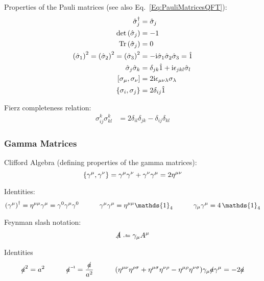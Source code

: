 			\noindent
			Properties of the Pauli matrices (see also Eq.~\ref{Eq:PauliMatricesQFT}):
			\begin{align}
				\label{Eq:PauliMatrices}
				\hat{\sigma}_j^\dagger &= \hat{\sigma}_j \\
				\det\qty(\hat{\sigma}_j) &= -1 \\
				\tr\qty(\hat{\sigma}_j) &= 0 \\
				\qty(\hat{\sigma}_1)^2 = \qty(\hat{\sigma}_2)^2 = \qty(\hat{\sigma}_3)^2 &= -\i\hat{\sigma}_1\hat{\sigma}_2\hat{\sigma}_3 = \hat{1} \\
				\hat{\sigma}_j \hat{\sigma}_k &= \delta_{jk}\hat{1} + \i\levicivita_{jkl}\hat{\sigma}_l \\
				\comm{\sigma_\mu}{\sigma_\nu} &= 2\i\levicivita_{\mu\nu\lambda}\sigma_\lambda \\
				\acomm{\sigma_i}{\sigma_j} &= 2\delta_{ij}\hat{1}
			\end{align}

			\noindent
			Fierz completeness relation:
			\begin{align}
				\sigma^k_{ij} \sigma^k_{kl} &= 2 \delta_{il} \delta_{jk} - \delta_{ij} \delta_{kl}
			\end{align}


		\subsubsection{Gamma Matrices}
			\noindent
			Clifford Algebra (defining properties of the gamma matrices):
			\begin{equation}
				\acomm{\gamma^\mu}{\gamma^\nu} = \gamma^\mu \gamma^\nu + \gamma^\nu \gamma^\mu = 2 \eta^{\mu\nu}
			\end{equation}

			\noindent
			Identities:
			\begin{equation}
				\qty(\gamma^\mu)^\dagger = \eta^{\mu\mu} \gamma^\mu = \gamma^0 \gamma^\mu \gamma^0
				\hsp \gamma^\mu \gamma^\mu = \eta^{\mu\mu} \mathds{1}_4
				\hsp \gamma_\mu \gamma^\mu = 4 \,\mathds{1}_4
			\end{equation}

			\noindent
			Feynman slash notation:
			\begin{equation}
				\slashed{A} \defeq \gamma_\mu A^\mu
			\end{equation}

			\noindent
			Identities
			\begin{equation}
				\slashed{a}^2 = a^2
				\hsp \inv{\slashed{a}} = \frac{\slashed{a}}{a^2}
				\hsp \qty(\eta^{\mu\nu}\eta^{\rho\sigma} + \eta^{\mu\sigma}\eta^{\nu\rho} - \eta^{\mu\rho}\eta^{\nu\sigma})
				\gamma_\mu \slashed{a} \gamma^\mu = -2 \slashed{a}
			\end{equation}

